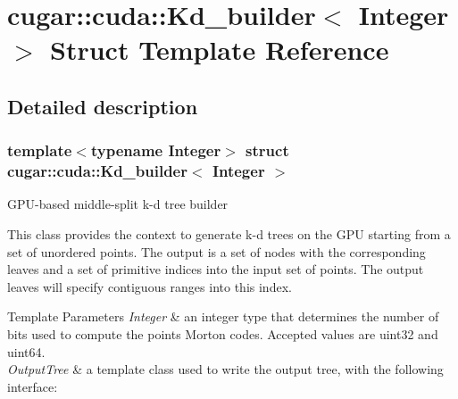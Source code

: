 \hypertarget{structcugar_1_1cuda_1_1_kd__builder}{}\section{cugar\+:\+:cuda\+:\+:Kd\+\_\+builder$<$ Integer $>$ Struct Template Reference}
\label{structcugar_1_1cuda_1_1_kd__builder}


\subsection{Detailed description}
\subsubsection*{template$<$typename Integer$>$\newline
struct cugar\+::cuda\+::\+Kd\+\_\+builder$<$ Integer $>$}

G\+P\+U-\/based middle-\/split k-\/d tree builder

This class provides the context to generate k-\/d trees on the G\+PU starting from a set of unordered points. The output is a set of nodes with the corresponding leaves and a set of primitive indices into the input set of points. The output leaves will specify contiguous ranges into this index.


\begin{DoxyTemplParams}{Template Parameters}
{\em Integer} & an integer type that determines the number of bits used to compute the points\textquotesingle{} Morton codes. Accepted values are uint32 and uint64.\\
\hline
{\em Output\+Tree} & a template class used to write the output tree, with the following interface\+:\\
\hline
\end{DoxyTemplParams}
\label{structcugar_1_1cuda_1_1_kd__builder_KdOutputTreeAnchor}%
%
 
